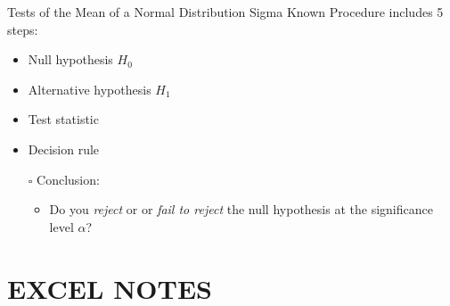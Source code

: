 \documentclass[
  10pt,
  ignorenonframetext,
]{beamer}
\begin{document}
\begin{frame}{Tests of the Mean of a Normal Distribution Sigma Known}
\protect\hypertarget{tests-of-the-mean-of-a-normal-distribution-sigma-known-7}{}
Procedure includes 5 steps:

\begin{itemize}
    \item Null hypothesis $H_0$
    \item Alternative hypothesis $H_1$
    \item Test statistic
    \item Decision rule
    \item [$\square$] Conclusion:
    \begin{itemize}
        \item Do you \textit{reject} or or \textit{fail to reject} the null hypothesis at the significance level $\alpha$?
    \end{itemize}
\end{itemize}
\end{frame}

\hypertarget{excel-notes}{%
\section{EXCEL NOTES}\label{excel-notes}}
\end{document}
